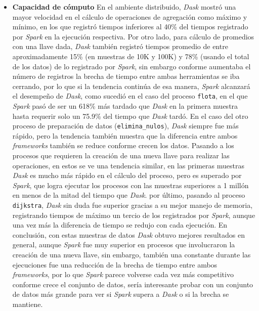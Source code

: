 \begin{itemize}
	\item \textbf{Capacidad de cómputo} En el ambiente distribuido, \textit{Dask} mostró una mayor velocidad en el cálculo de operaciones de agregación como máximo y mínimo, en los que registró tiempos inferiores al 40\% del tiempos registrado por \textit{Spark} en la ejecución respectiva. Por otro lado, para cálculo de promedios con una llave dada, \textit{Dask} también registró tiempos promedio de entre aproximadamente 15\% (en muestras de 10K y 100K) y 78\% (usando el total de los datos) de lo registrado por \textit{Spark}, sin embargo conforme aumentaba el número de registros la brecha de tiempo entre ambas herramientas se iba cerrando, por lo que si la tendencia continúa de esa manera, \textit{Spark} alcanzará el desempeño de \textit{Dask}, como sucedió en el caso del proceso \texttt{flota}, en el que \textit{Spark} pasó de ser un 618\% más tardado que \textit{Dask} en la primera muestra hasta requerir solo un 75.9\% del tiempo que \textit{Dask} tardó. En el caso del otro proceso de preparación de datos (\texttt{elimina\_nulos}), \textit{Dask} siempre fue más rápido, pero la tendencia también muestra que la diferencia entre ambos \textit{frameworks} también se reduce conforme crecen los datos. Pasando a los procesos que requieren la creación de una nueva llave para realizar las operaciones, en estos se ve una tendencia similar, en las primeras muestras \textit{Dask} es mucho más rápido en el cálculo del proceso, pero es superado por \textit{Spark}, que logra ejecutar los procesos con las muestras superiores a 1 millón en menos de la mitad del tiempo que \textit{Dask}. por último, pasando al proceso \texttt{dijkstra}, \textit{Dask} sin duda fue superior gracias a su mejor manejo de memoria, registrando tiempos de máximo un tercio de los registrados por \textit{Spark}, aunque una vez más la diferencia de tiempo se redujo con cada ejecución. En conclusión, con estas muestras de datos \textit{Dask} obtuvo mejores resultados en general, aunque \textit{Spark} fue muy superior en procesos que involucraron la creación de una nueva llave, sin embargo, también una constante durante las ejecuciones fue una reducción de la brecha de tiempo entre ambos \textit{frameworks}, por lo que \textit{Spark} parece volverse cada vez más competitivo conforme crece el conjunto de datos, sería interesante probar con un conjunto de datos más grande para ver si \textit{Spark} supera a \textit{Dask} o si la brecha se mantiene.
	

\end{itemize}
